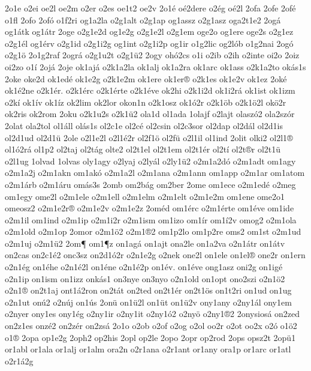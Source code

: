 {2o1e
o2ei
oe2l
oe2m
o2er
o2es
oe1t2
oe2v
2o1^^e9
o^^e92dere
o2^^e9g
o^^e92l
2ofa
2ofe
2of^^e9
o1fl
2ofo
2of^^f3
o1f2ri
og1a2la
o2g1alt
o2g1ap
og1assz
o2g1asz
oga2t1e2
2og^^e1
og1^^e1tk
og1^^e1tr
2oge
o2g1e2d
og1e2g
o2g1e2l
o2g1em
oge2o
og1ere
oge2s
o2g1ez
o2g1^^e9l
og1^^e9rv
o2g1id
o2g1i2g
og1int
o2g1i2p
og1ir
o1g2lic
og2l^^f3b
o1g2nai
2og^^f3
o2g1^^f6
2o1g2raf
2ogr^^e1
o2g1u2t
o2g1^^fc2
2ogy
oh^^f32cs
o1i
o2ib
o2ih
o2inte
oi2o
2oiz
oi2zo
o1^^ed
2oj^^e1
2oje
ok1aj^^e1
o2k1a2la
ok1alj
ok1a2ra
ok1arc
ok1ass
o2k1a2to
ok^^e1s1s
2oke
oke2d
ok1ed^^e9
ok1e2g
o2k1e2m
ok1ere
ok1er^^ae
o2k1es
ok1e2v
ok1ez
2ok^^e9
ok1^^e92ne
o2k1^^e9r.
o2k1^^e9rc
o2k1^^e9rte
o2k1^^e9ve
ok2hi
o2k1i2d
ok1i2r^^e1
ok1ist
ok1izm
o2k^^ed
ok1^^edv
ok1^^edz
ok2lim
ok2lor
okon1n
o2k1osz
ok1^^f32r
o2k1^^f6b
o2k1^^f62l
ok^^f62r
ok2ris
ok2rom
2oku
o2k1u2s
o2k1^^fc2
ola1d
ol1ada
1olajf
o2lajt
olasz^^f32
ola2sz^^f3r
2olat
ola2tol
ol1^^e1ll
ol^^e1s1s
ol2c1e
ol2c^^e9
ol2csin
ol2c3sor
ol2dap
ol2d^^e1l
ol2d1is
ol2d1ud
ol2d1^^fc
2ole
o2l1e2l
o2l1^^e92r
ol2f1^^f6
ol2f^^fc
o2l1il
ol1ind
2olit
olki2
ol2l1^^ae
ol1^^f32r^^e1
ol1p2
ol2taj
ol2t^^e1g
olte2
ol2t1el
ol2t1em
ol2t1^^e9r
ol2t^^ed
ol2t^^aer
ol2t1^^fc
o2l1ug
1olvad
1olvas
oly1agy
o2lyaj
o2ly^^e1l
o2ly1^^fc2
o2m1a2d^^f3
o2m1adt
om1agy
o2m1a2j
o2m1akn
om1ak^^f3
o2m1a2l
o2m1ana
o2m1ann
om1app
o2m1ar
om1atom
o2m1^^e1rb
o2m1^^e1ru
om^^e1s3s
2omb
om2b^^e1g
om2ber
2ome
om1ece
o2m1ed^^e9
o2meg
om1egy
ome2l
o2m1ele
o2m1ell
o2m1elm
o2m1elt
o2m1e2m
om1ene
ome2o1
omeosz2
o2m1e2r^^ae
o2m1e2v
o2m1e2z
2om^^e9d
om1^^e9rc
o2m1^^e9rte
om1^^e9ve
om1ide
o2m1il
om1ind
o2m1ip
o2m1i2r
o2m1ism
om1izo
om1^^edr
om1^^ed2v
omog2
o2m1ola
o2m1old
o2m1op
2omor
o2m1^^f62
o2m1^^ae2
om1p2lo
om1p2re
oms2
om1st
o2m1ud
o2m1uj
o2m1^^fc2
2om^^b6
om1^^b6z
on1ag^^e1
on1ajt
ona2le
on1a2va
o2n1^^e1tr
on1^^e1tv
on2cas
on2c1^^e92
onc3sz
on2d1^^f32r
o2n1e2g
o2nek
one2l
on1ele
on1el^^ae
one2r
on1ern
o2n1^^e9g
on1^^e9he
o2n1^^e92l
on1^^e9ne
o2n1^^e92p
on1^^e9v.
on1^^e9ve
ong1asz
oni2g
on1ig^^e9
o2n1ip
on1ism
on1izz
onk^^e1s1
on3nye
on3nyo
o2n1old
on1opt
ono2szi
o2n1^^f62
o2n1^^ae
on2t1aj
ont1^^e12ron
on2t^^e1t
on2ted
on2t1^^e9r
on2t1^^f6s
on1t2ri
on1ud
on1ug
o2n1ut
on^^fa2
o2n^^faj
on1^^fas
2on^^fc
on1^^fc2l
on1^^fct
on1^^fc2v
ony1any
o2ny1^^e1l
ony1em
o2nyer
ony1es
ony1^^e9g
o2ny1ir
o2ny1it
o2ny1^^f32
o2ny^^f6
o2ny1^^ae2
2onysios^^e1
on2zed
on2z1es
onz^^e92
on2z^^e9r
on2zs^^e1
2o1o
o2ob
o2of
o2og
o2ol
oo2r
o2ot
oo2x
o2^^f3
o1^^f62
o1^^ae
2opa
op1e2g
2oph2
op2his
2opl
op2le
2opo
2opr
op2rod
2ops
opsz2t
2op^^fc1
or1abl
or1ala
or1alj
or1alm
ora2n
o2r1ana
o2r1ant
or1any
ora1p
or1arc
or1atl
o2r1^^e12g
}
